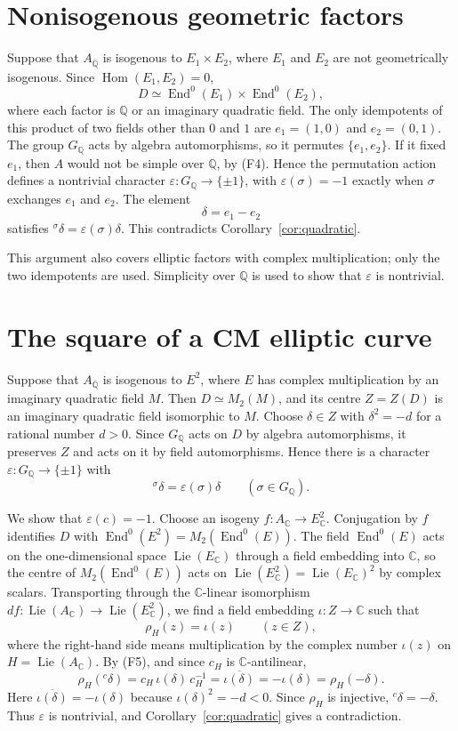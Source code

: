 \documentclass[11pt]{article}
\newcommand{\Q}{\mathbb Q}
\newcommand{\C}{\mathbb C}
\DeclareMathOperator{\End}{End}
\DeclareMathOperator{\Lie}{Lie}
\begin{document}
\section{Nonisogenous geometric factors}\label{sec:nonisogenous}

Suppose that \(A_{\overline{\Q}}\) is isogenous to \(E_1\times E_2\),
where \(E_1\) and \(E_2\) are not geometrically isogenous. Since
\(\operatorname{Hom}(E_1,E_2)=0\),
\[
 D\simeq\End^0(E_1)\times\End^0(E_2),
\]
where each factor is \(\Q\) or an imaginary quadratic field. The only
idempotents of this product of two fields other than \(0\) and \(1\)
are \(e_1=(1,0)\) and \(e_2=(0,1)\). The group \(G_{\Q}\) acts by
algebra automorphisms, so it permutes \(\{e_1,e_2\}\). If it fixed
\(e_1\), then \(A\) would not be simple over \(\Q\), by (F4). Hence the
permutation action defines a nontrivial character
\(\varepsilon:G_{\Q}\to\{\pm1\}\), with \(\varepsilon(\sigma)=-1\)
exactly when \(\sigma\) exchanges \(e_1\) and \(e_2\). The element
\[
 \delta=e_1-e_2
\]
satisfies \({}^\sigma\delta=\varepsilon(\sigma)\delta\). This
contradicts Corollary~\ref{cor:quadratic}.

This argument also covers elliptic factors with complex
multiplication; only the two idempotents are used. Simplicity over
\(\Q\) is used to show that \(\varepsilon\) is nontrivial.

\section{The square of a CM elliptic curve}\label{sec:cm-square}

Suppose that \(A_{\overline{\Q}}\) is isogenous to \(E^2\), where \(E\)
has complex multiplication by an imaginary quadratic field \(M\). Then
\(D\simeq M_2(M)\), and its centre \(Z=Z(D)\) is an imaginary quadratic
field isomorphic to \(M\). Choose \(\delta\in Z\) with
\(\delta^2=-d\) for a rational number \(d>0\). Since \(G_{\Q}\) acts on
\(D\) by algebra automorphisms, it preserves \(Z\) and acts on it by
field automorphisms. Hence there is a character
\(\varepsilon:G_{\Q}\to\{\pm1\}\) with
\[
 {}^\sigma\delta=\varepsilon(\sigma)\delta\qquad(\sigma\in G_{\Q}).
\]

We show that \(\varepsilon(c)=-1\). Choose an isogeny
\(f:A_{\C}\to E_{\C}^2\). Conjugation by \(f\) identifies \(D\) with
\(\End^0(E^2)=M_2(\End^0(E))\). The field \(\End^0(E)\) acts on the
one-dimensional space \(\Lie(E_{\C})\) through a field embedding into
\(\C\), so the centre of \(M_2(\End^0(E))\) acts on
\(\Lie(E_{\C}^2)=\Lie(E_{\C})^2\) by complex scalars. Transporting
through the \(\C\)-linear isomorphism
\(df:\Lie(A_{\C})\to\Lie(E^2_{\C})\), we find a field embedding
\(\iota:Z\to\C\) such that
\[
 \rho_H(z)=\iota(z)\qquad(z\in Z),
\]
where the right-hand side means multiplication by the complex number
\(\iota(z)\) on \(H=\Lie(A_{\C})\). By (F5), and since \(c_H\) is
\(\C\)-antilinear,
\[
 \rho_H({}^c\delta)=c_H\,\iota(\delta)\,c_H^{-1}
 =\overline{\iota(\delta)}=-\iota(\delta)=\rho_H(-\delta).
\]
Here \(\overline{\iota(\delta)}=-\iota(\delta)\) because
\(\iota(\delta)^2=-d<0\). Since \(\rho_H\) is injective,
\({}^c\delta=-\delta\). Thus \(\varepsilon\) is nontrivial, and
Corollary~\ref{cor:quadratic} gives a contradiction.
\end{document}

